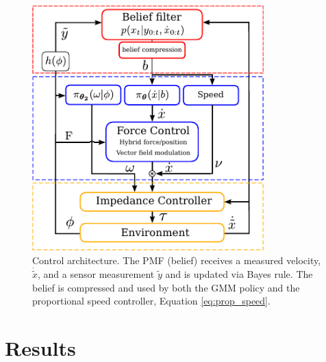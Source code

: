 \documentclass[final,3p,times,twocolumn]{elsarticle}
\begin{document}
\begin{figure}
  \centering
  \includegraphics[width=0.8\textwidth]{./Figures/control_flow_final.pdf}
  \caption{Control architecture. The PMF (belief) receives a measured velocity, $\dot{\tilde{x}}$, and 
  a sensor measurement $\tilde{y}$ and is updated via Bayes rule. The belief is compressed and used by both the GMM policy and the proportional speed controller, Equation \ref{eq:prop_speed}.}
  \label{fig:control_flow}
\end{figure}


\FloatBarrier
\section{Results}\label{ch4:results}
\end{document}
